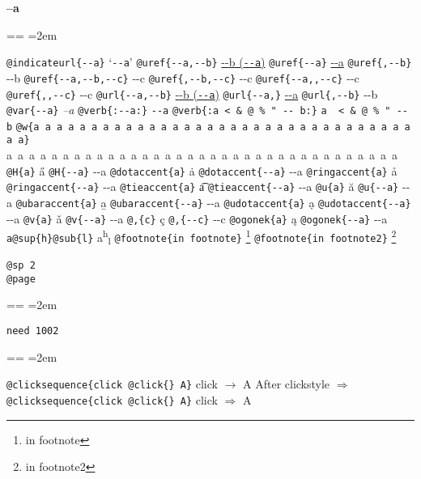 \documentclass{book}
\makeatletter
\newcommand\GNUTexinfocommandstyletextvar[1]{{\normalfont{}\textsl{#1}}}%
\newenvironment{GNUTexinfopreformatted}{%
  \par\obeylines\obeyspaces\frenchspacing
  \parskip=\z@\parindent=\z@}{}
\makeatother
\begin{document}
{\huge \bfseries --a}\begin{GNUTexinfopreformatted}
\leftskip=2em\relax\ttfamily%

\texttt{@indicateurl\{{-}{-}a\}} `\texttt{{-}{-}a}'
\texttt{@uref\{{-}{-}a,{-}{-}b\}} \href{--a}{{-}{-}b (\nolinkurl{--a})}
\texttt{@uref\{{-}{-}a\}} \url{--a}
\texttt{@uref\{,{-}{-}b\}} {-}{-}b
\texttt{@uref\{{-}{-}a,{-}{-}b,{-}{-}c\}} {-}{-}c
\texttt{@uref\{,{-}{-}b,{-}{-}c\}} {-}{-}c
\texttt{@uref\{{-}{-}a{,}{,}{-}{-}c\}} {-}{-}c
\texttt{@uref\{{,}{,}{-}{-}c\}} {-}{-}c
\texttt{@url\{{-}{-}a,{-}{-}b\}} \href{--a}{{-}{-}b (\nolinkurl{--a})}
\texttt{@url\{{-}{-}a,\}} \url{--a}
\texttt{@url\{,{-}{-}b\}} {-}{-}b
\texttt{@var\{{-}{-}a\}} \GNUTexinfocommandstyletextvar{--a}
\texttt{@verb\{:{-}{-}a:\}} \verb:--a:
\texttt{@verb\{:a  < \& @ \% " {-}{-}    b:\}} \verb:a  < & @ % " --    b:
\texttt{@w\{a a a a a a a a a a a a a a a a a a a a a a a a a a a a a a a a a a a\}} \hbox{a a a a a a a a a a a a a a a a a a a a a a a a a a a a a a a a a a a}
\texttt{@H\{a\}} \H{a}
\texttt{@H\{{-}{-}a\}} \H{{-}{-}a}
\texttt{@dotaccent\{a\}} \.{a}
\texttt{@dotaccent\{{-}{-}a\}} \.{{-}{-}a}
\texttt{@ringaccent\{a\}} \r{a}
\texttt{@ringaccent\{{-}{-}a\}} \r{{-}{-}a}
\texttt{@tieaccent\{a\}} \t{a}
\texttt{@tieaccent\{{-}{-}a\}} \t{{-}{-}a}
\texttt{@u\{a\}} \u{a}
\texttt{@u\{{-}{-}a\}} \u{{-}{-}a}
\texttt{@ubaraccent\{a\}} \b{a}
\texttt{@ubaraccent\{{-}{-}a\}} \b{{-}{-}a}
\texttt{@udotaccent\{a\}} \d{a}
\texttt{@udotaccent\{{-}{-}a\}} \d{{-}{-}a}
\texttt{@v\{a\}} \v{a}
\texttt{@v\{{-}{-}a\}} \v{{-}{-}a}
\texttt{@,\{c\}} \c{c}
\texttt{@,\{{-}{-}c\}} \c{{-}{-}c}
\texttt{@ogonek\{a\}} \k{a}
\texttt{@ogonek\{{-}{-}a\}} \k{{-}{-}a}
\texttt{a@sup\{h\}@sub\{l\}} a\textsuperscript{h}\textsubscript{l}
\texttt{@footnote\{in footnote\}} \footnote{in footnote}
\texttt{@footnote\{in footnote2\}} \footnote{in footnote2}

\texttt{@sp 2}\leavevmode{}\\
\baselineskip %
\texttt{@page}\leavevmode{}\\
\end{GNUTexinfopreformatted}
\newpage{}%
\phantom{blabla}%
\begin{GNUTexinfopreformatted}
\leftskip=2em\relax\ttfamily%

\texttt{need 1002}
\end{GNUTexinfopreformatted}
\needspace{1.002pt}%
\begin{GNUTexinfopreformatted}
\leftskip=2em\relax\ttfamily%

\texttt{@clicksequence\{click @click\{\} A\}} click $\rightarrow{}$ A
After clickstyle $\Rightarrow{}$
\texttt{@clicksequence\{click @click\{\} A\}} click $\Rightarrow{}$ A


\end{GNUTexinfopreformatted}
\end{document}
